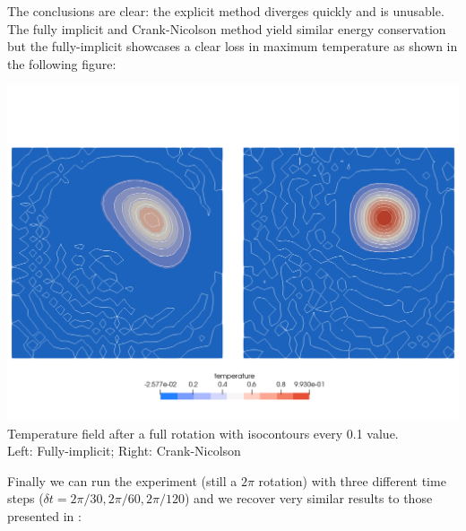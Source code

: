The conclusions are clear: the explicit method diverges quickly and is unusable. The fully implicit and Crank-Nicolson 
method yield similar energy conservation but the fully-implicit showcases a clear loss in maximum temperature as shown in the following figure:
\begin{center}
\includegraphics[width=15cm]{python_codes/fieldstone_43/images/temp}\\
{\small Temperature field after a full rotation with isocontours every 0.1 value.\\ Left: Fully-implicit; Right: Crank-Nicolson}
\end{center}

Finally we can run the experiment (still a $2\pi$ rotation) 
with three different time steps ($\delta t=2\pi/30,2\pi/60,2\pi/120$) 
and we recover very similar results to those presented in \cite{dohu03}:

